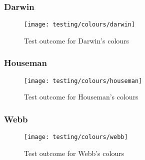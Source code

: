 \subsubsection{Darwin} %
\label{ssub:darwin}
\begin{figure}[!htbp]
  \texttt{[image: testing/colours/darwin]}
  \caption{Test outcome for Darwin's colours}
\end{figure}

\subsubsection{Houseman} %
\label{ssub:houseman}
\begin{figure}[!htbp]
  \texttt{[image: testing/colours/houseman]}
  \caption{Test outcome for Houseman's colours}
\end{figure}

\subsubsection{Webb} %
\label{ssub:webb}
\begin{figure}[!htbp]
  \texttt{[image: testing/colours/webb]}
  \caption{Test outcome for Webb's colours}
\end{figure}
